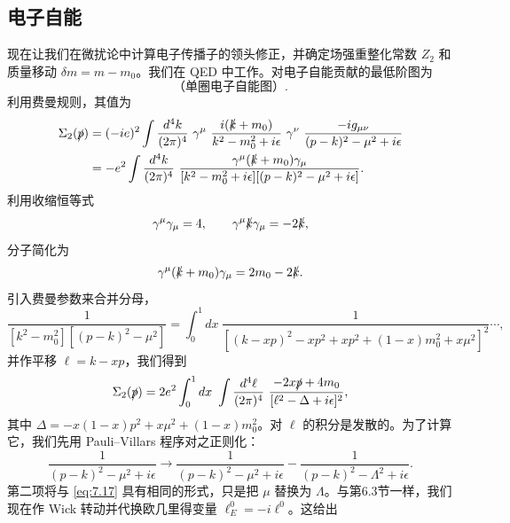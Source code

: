 \subsection{电子自能}

现在让我们在微扰论中计算电子传播子的领头修正，并确定场强重整化常数 $Z_2$ 和质量移动 $\delta m = m - m_0$。我们在 QED 中工作。对电子自能贡献的最低阶图为
\begin{equation}
  \text{（单圈电子自能图）} .
  \label{eq:7.15}
\end{equation}
利用费曼规则，其值为
\begin{equation}
  \begin{aligned}
    \Sigma_2(\slashed{p}) &= (-ie)^2\int \frac{d^4k}{(2\pi)^4}\
      \gamma^\mu\ \frac{i(\slashed{k}+m_0)}{k^2-m_0^2+i\epsilon}\
      \gamma^\nu\ \frac{-ig_{\mu\nu}}{(p-k)^2-\mu^2+i\epsilon}\\
    &= -e^2\int \frac{d^4k}{(2\pi)^4}\
      \frac{\gamma^\mu(\slashed{k}+m_0)\gamma_\mu}
        {[k^2-m_0^2+i\epsilon][(p-k)^2-\mu^2+i\epsilon]} .
  \end{aligned}
  \label{eq:7.16}
\end{equation}
利用收缩恒等式
\begin{equation}
  \gamma^\mu\gamma_\mu = 4,\qquad
  \gamma^\mu\slashed{k}\gamma_\mu = -2\slashed{k},
\end{equation}
分子简化为
\begin{equation}
  \gamma^\mu(\slashed{k}+m_0)\gamma_\mu = 2m_0 - 2\slashed{k} .
\end{equation}
引入费曼参数来合并分母，
\begin{equation}
  \frac{1}{[k^2-m_0^2][(p-k)^2-\mu^2]}
  = \int_0^1 dx\ \frac{1}{[(k-xp)^2 - xp^2 + xp^2 + (1-x)m_0^2 + x\mu^2]^2}
  \cdots ,
\end{equation}
并作平移 $\ell = k - xp$，我们得到
\begin{equation}
  \Sigma_2(\slashed{p}) = 2e^2\int_0^1 dx\ \int
    \frac{d^4\ell}{(2\pi)^4}\ \frac{-2x\slashed{p} + 4m_0}
      {[\ell^2 - \Delta + i\epsilon]^2},
  \label{eq:7.17}
\end{equation}
其中 $\Delta = -x(1-x)p^2 + x\mu^2 + (1-x)m_0^2$。对 $\ell$ 的积分是发散的。为了计算它，我们先用 Pauli--Villars 程序对之正则化：
\begin{equation}
  \frac{1}{(p-k)^2-\mu^2+i\epsilon}
    \to \frac{1}{(p-k)^2-\mu^2+i\epsilon}
      - \frac{1}{(p-k)^2-\Lambda^2+i\epsilon} .
\end{equation}
第二项将与 \eqref{eq:7.17} 具有相同的形式，只是把 $\mu$ 替换为 $\Lambda$。与第6.3节一样，我们现在作 Wick 转动并代换欧几里得变量 $\ell_E^0 = -i\ell^0$。这给出
